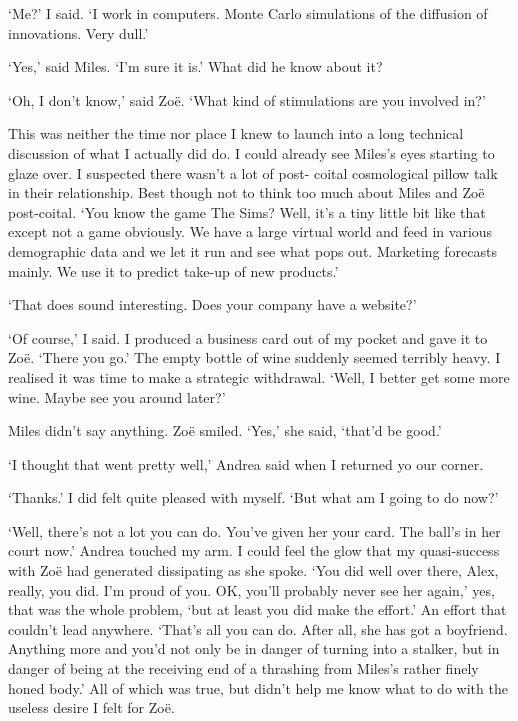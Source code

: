 `Me?' I said. `I work in computers. Monte Carlo simulations of the
diffusion of innovations. Very dull.'

`Yes,' said Miles. `I'm sure it is.' What did he know about
it?

`Oh, I don't know,' said Zoë. `What kind of stimulations are you
involved in?'

This was neither the time nor place I knew to launch into a long
technical discussion of what I actually did do. I could already see Miles's eyes
starting to glaze over. I suspected there wasn't a lot of post-
coital cosmological pillow talk in their relationship. Best though not to
think too much about Miles and Zoë post-coital. `You know the
game {\twelvesl The Sims\/}? Well, it's a tiny little bit like that except not a game obviously.
We have a large virtual world and feed in various demographic data
and we let it run and see what pops out. Marketing forecasts mainly.
We use it to predict take-up of new products.'

`That does sound interesting. Does your company have a website?'

`Of course,' I said. I produced a business card out of my pocket and
gave it to Zoë. `There you go.' The empty bottle of wine suddenly seemed terribly heavy. I realised it was time to make a strategic
withdrawal. `Well, I better get some more wine. Maybe see you around
later?'

Miles didn't say anything. Zoë smiled. `Yes,' she said, `that'd
be good.'

`I thought that went pretty well,' Andrea said when I returned yo
our corner.

`Thanks.' I did felt quite pleased with myself. `But what am I going
to do now?'

`Well, there's not a lot you can do. You've given her your card. The
ball's in her court now.' Andrea touched my arm. I could feel the
glow that my quasi-success with Zoë had generated dissipating as
she spoke. `You did well over there, Alex, really, you did. I'm
proud of you. OK, you'll probably never see her again,' yes, that
was the whole problem, `but at least you did make the effort.' An
effort that couldn't lead anywhere. `That's all you can do. After
all, she has got a boyfriend. Anything more and you'd not only be in
danger of turning into a stalker, but in danger of being at the
receiving end of a thrashing from Miles's rather finely honed body.'
All of which was true, but didn't help me know what to do with the
useless desire I felt for Zoë.

